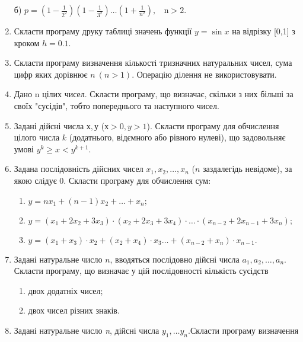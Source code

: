 \documentclass[]{article}
\makeatletter
\newcommand{\xslalph}[1]{\expandafter\@xslalph\csname c@#1\endcsname}
\newcommand{\@xslalph}[1]{%
    \ifcase#1\or а\or б\or в\or г\or д\or e\or є\or ж\or з\or i%
    \or й\or к\or л\or м\or н\or о\or п\or р\or с\or т%
    \or у\or ф\or х\or ц\or ч\or ш\or ю\or я\or аа\or бб\or вв %
    \else\@ctrerr\fi%
}
\makeatother
\begin{document}
\begin{enumerate}
б)
\(p = \left( 1 - \frac{1}{2^{2}} \right)\left( 1 - \frac{1}{3^{2}} \right)\ldots\left( 1 + \frac{1}{n^{2}} \right),\mathrm{\ \ \ \ n > 2.}\)

\item
  Скласти програму друку таблиці значень функції \(y = \sin x\) на
  відрізку {[}0,1{]} з кроком \(h = 0.1\).
\item
Скласти програму визначення кількості тризначних натуральних чисел, сума
цифр яких дорівнює \(n\ (n > 1).\) Операцію ділення не використовувати.
\item
Дано n цілих чисел. Скласти програму, що визначає, скільки з них більші
за своїх "сусідів", тобто попереднього та наступного чисел.

\item
Задані дійсні числа $х,у$ ($х>0, y>1$). Скласти програму для
обчислення цілого числа $k$ (додатнього, відємного або рівного нулеві), що
задовольняє умові $y^{k}\ge x <y^{k+1}$.
\item
Задана послідовність дійсних чисел $x_{1},x_{2},\ldots,x_{n}$ ($n$ заздалегідь невідоме), за якою слідує 0. 
Скласти програму для обчислення сум:
\begin{enumerate}[label=\xslalph*)]
\item
 \(  y = n x_{1} + (n-1) x_{2} + \ldots + x_{n}; \)
\item
 \(  y = (x_{1} + 2 x_{2} + 3x_{3})\cdot (x_{2} + 2 x_{3} + 3x_{4})\cdot \ldots \cdot(x_{n-2} + 2 x_{n-1} + 3x_{n}); \)
\item
 \(  y = (x_{1} + x_{3})\cdot x_{2} + (x_{2} + x_{4})\cdot x_{3} \ldots + (x_{n-2} + x_{n})\cdot x_{n-1}. \)
\end{enumerate}

\item
 Задані натуральне число $n$, вводяться послідовно дійсні числа $a_{1}, a_{2},\ldots, a_{n} $. Скласти
програму, що визначає у цій послідовності кількість сусідств
\begin{enumerate}[label=\xslalph*)]
\item
 двох додатніх чисел;
\item
двох чисел різних знаків.
\end{enumerate}

\item
  Задані натуральне число \emph{n}, дійсні числа
  \(y_{1},\ldots y_{n}.\)Скласти програму визначення

\begin{enumerate}[label=\xslalph*)]


\end{enumerate}
\end{enumerate}
\end{document}
